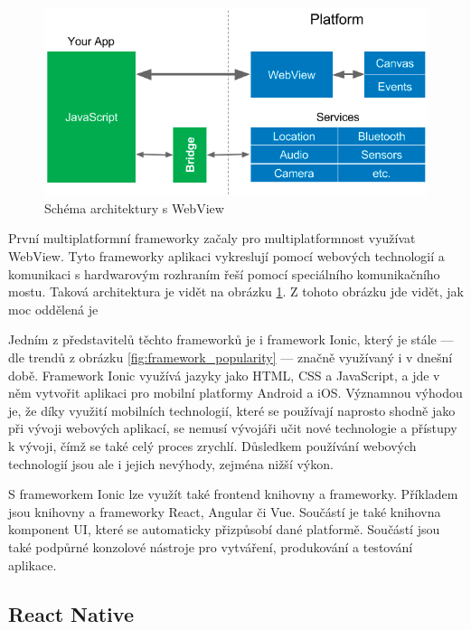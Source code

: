 \begin{figure}[ht!]
    \centering
    \includegraphics[width=\linewidth]{assets/technology-research/framework/webview.png}
    \caption{Schéma architektury s WebView  \cite{hackernoon_flutter}}
    \label{fig:framework_webview}
\end{figure}

První multiplatformní frameworky začaly pro multiplatformnost využívat WebView.
\cite{hackernoon_flutter}
Tyto frameworky aplikaci vykreslují pomocí webových technologií
a komunikaci s hardwarovým rozhraním řeší pomocí speciálního komunikačního
mostu.
Taková architektura je vidět na obrázku \ref{fig:framework_webview}.
Z tohoto obrázku jde vidět,
jak moc oddělená je 

Jedním z představitelů těchto frameworků je i framework Ionic,
který je stále
--- dle trendů z obrázku \ref{fig:framework_popularity} ---
značně využívaný i v dnešní době.
Framework Ionic využívá jazyky jako HTML, CSS a JavaScript,
a jde v něm vytvořit aplikaci pro mobilní platformy Android a iOS.
Významnou výhodou je,
že díky využití mobilních technologií,
které se používají naprosto shodně jako při vývoji webových aplikací,
se nemusí vývojáři učit nové technologie a přístupy k vývoji,
čímž se také celý proces zrychlí.
Důsledkem používání webových technologií jsou ale i jejich nevýhody,
zejména nižší výkon. \cite{dashmagazine_mobile_frameworks}

S frameworkem Ionic lze využít také frontend knihovny a frameworky. \cite{ionic}
Příkladem jsou knihovny a frameworky React, Angular či Vue.
Součástí je také knihovna komponent UI,
které se automaticky přizpůsobí dané platformě.
Součástí jsou také podpůrné konzolové nástroje pro vytváření, produkování a
testování aplikace.

\subsection{React Native}

